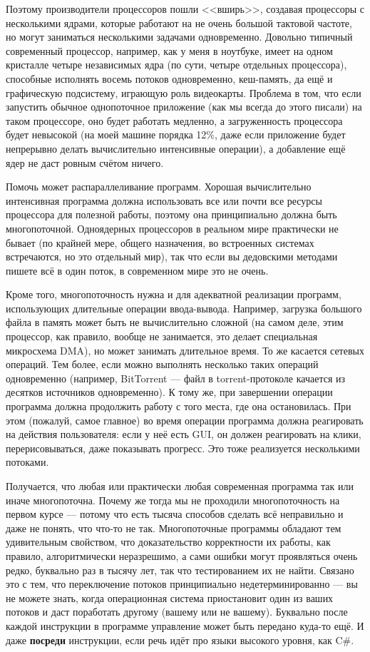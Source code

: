 \documentclass[a5paper]{article}
\begin{document}
Поэтому производители процессоров пошли <<вширь>>, создавая процессоры с несколькими ядрами, которые работают на не очень большой тактовой частоте, но могут заниматься несколькими задачами одновременно. Довольно типичный современный процессор, например, как у меня в ноутбуке, имеет на одном кристалле четыре независимых ядра (по сути, четыре отдельных процессора), способные исполнять восемь потоков одновременно, кеш-память, да ещё и графическую подсистему, играющую роль видеокарты. Проблема в том, что если запустить обычное однопоточное приложение (как мы всегда до этого писали) на таком процессоре, оно будет работать медленно, а загруженность процессора будет невысокой (на моей машине порядка 12\%, даже если приложение будет непрерывно делать вычислительно интенсивные операции), а добавление ещё ядер не даст ровным счётом ничего.

Помочь может распараллеливание программ. Хорошая вычислительно интенсивная программа должна использовать все или почти все ресурсы процессора для полезной работы, поэтому она принципиально должна быть многопоточной. Одноядерных процессоров в реальном мире практически не бывает (по крайней мере, общего назначения, во встроенных системах встречаются, но это отдельный мир), так что если вы дедовскими методами пишете всё в один поток, в современном мире это не очень.

Кроме того, многопоточность нужна и для адекватной реализации программ, использующих длительные операции ввода-вывода. Например, загрузка большого файла в память может быть не вычислительно сложной (на самом деле, этим процессор, как правило, вообще не занимается, это делает специальная микросхема DMA), но может занимать длительное время. То же касается сетевых операций. Тем более, если можно выполнять несколько таких операций одновременно (например, BitTorrent --- файл в torrent-протоколе качается из десятков источников одновременно). К тому же, при завершении операции программа должна продолжить работу с того места, где она остановилась. При этом (пожалуй, самое главное) во время операции программа должна реагировать на действия пользователя: если у неё есть GUI, он должен реагировать на клики, перерисовываться, даже показывать прогресс. Это тоже реализуется несколькими потоками.

Получается, что любая или практически любая современная программа так или иначе многопоточна. Почему же тогда мы не проходили многопоточность на первом курсе --- потому что есть тысяча способов сделать всё неправильно и даже не понять, что что-то не так. Многопоточные программы обладают тем удивительным свойством, что доказательство корректности их работы, как правило, алгоритмически неразрешимо, а сами ошибки могут проявляться очень редко, буквально раз в тысячу лет, так что тестированием их не найти. Связано это с тем, что переключение потоков принципиально недетерминированно --- вы не можете знать, когда операционная система приостановит один из ваших потоков и даст поработать другому (вашему или не вашему). Буквально после каждой инструкции в программе управление может быть передано куда-то ещё. И даже \textbf{посреди} инструкции, если речь идёт про языки высокого уровня, как C\#.
\end{document}
